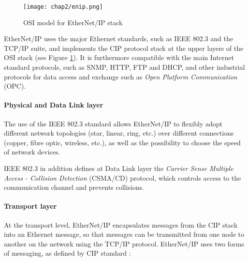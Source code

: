 \begin{figure}[ht]
	\centering
	\texttt{[image: chap2/enip.png]}
	\caption{OSI model for EtherNet/IP stack}
	\label{fig:enip}
\end{figure}

EtherNet/IP uses the major Ethernet standards, such as IEEE 802.3 and the TCP/IP suite, and implements the CIP protocol stack at the upper layers of the OSI stack (see Figure \ref{fig:enip}). It is furthermore compatible with the main Internet standard protocols, such as SNMP, HTTP, FTP and DHCP, and other industrial protocols for data access and exchange such as \textit{Open Platform Communication} (OPC).

\paragraph{Physical and Data Link layer}

The use of the IEEE 802.3 standard allows EtherNet/IP to flexibly adopt different network topologies (star, linear, ring, etc.) over different connections (copper, fibre optic, wireless, etc.), as well as the possibility to choose the speed of network devices. 

IEEE 802.3 in addition defines at Data Link layer the \textit{Carrier Sense Multiple Access - Collision Detection} (CSMA/CD) protocol, which controls access to the communication channel and prevents collisions.

\paragraph{Transport layer} 

At the transport level, EtherNet/IP encapsulates messages from the CIP stack into an Ethernet message, so that messages can be transmitted from one node to another on the network using the TCP/IP protocol. EtherNet/IP uses two forms of messaging, as
defined by CIP standard \cite{enip_pdf}\cite{enip_pdf2}:

